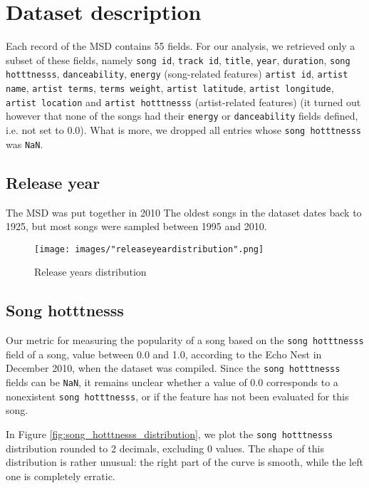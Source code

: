 \documentclass[11pt]{article}
\renewcommand\_{\textunderscore\allowbreak}
\begin{document}
\section{Dataset description}
Each record of the MSD contains 55 fields.
For our analysis, we retrieved only a subset of these fields, namely \texttt{song id}, \texttt{track id}, \texttt{title}, \texttt{year}, \texttt{duration}, \texttt{song hotttnesss}, \texttt{danceability}, \texttt{energy} (song-related features) \texttt{artist id}, \texttt{artist name}, \texttt{artist terms}, \texttt{terms weight}, \texttt{artist latitude},  \texttt{artist longitude}, \texttt{artist location} and \texttt{artist hotttnesss} (artist-related features) 
(it turned out however that none of the songs had their \texttt{energy} or \texttt{danceability} fields defined, i.e. not set to 0.0).
What is more, we dropped all entries whose \texttt{song hotttnesss} was \texttt{NaN}.

\subsection{Release year}
The MSD was put together in 2010
The oldest songs in the dataset dates back to 1925, but most songs were sampled between 1995 and 2010.

\begin{figure}[h!]
\centering
\captionsetup{width=1.0\textwidth}
\texttt{[image: images/"release\_year\_distribution".png]}
\caption{Release years distribution}
\label{fig:song_duration}
\end{figure}

\subsection{Song hotttnesss}
Our metric for measuring the popularity of a song based on the \texttt{song hotttnesss} field of a song, value between 0.0 and 1.0, according to the Echo Nest in December 2010, when the dataset was compiled.
Since the \texttt{song hotttnesss} fields can be \texttt{NaN}, it remains unclear whether a value of 0.0 corresponds to a nonexistent \texttt{song hotttnesss}, or if the feature has not been evaluated for this song.

In Figure \ref{fig:song_hotttnesss_distribution}, we plot the \texttt{song hotttnesss} distribution rounded to 2 decimals, excluding 0 values. 
The shape of this distribution is rather unusual: the right part of the curve is smooth, while the left one is completely erratic.
\end{document}
